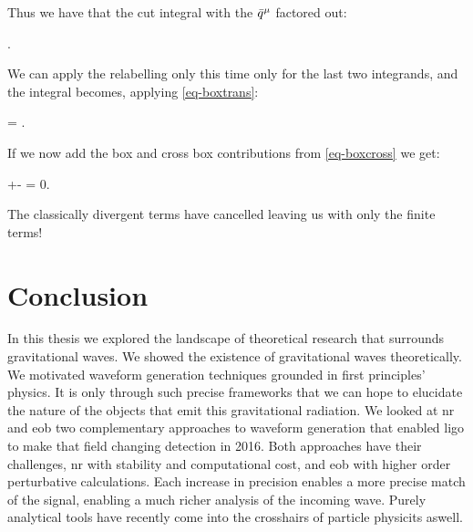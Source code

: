 \documentclass[
  10pt,
  a4paper,
  DIV=11,
  numbers=noendperiod,
  twoside]{scrreprt}
\let\[\relax \let\]\relax %
\DeclareRobustCommand{\[}{\begin{equation}}
\DeclareRobustCommand{\]}{\end{equation}}
\begin{document}
Thus we have that the cut integral with the \(\bar{q}_{}{}^{\mu}\) factored out:

\[
\int \dn[4]{\bar{\ell}}\Half{} .
\]

We can apply the relabelling only this time only for the last two
integrands, and the integral becomes, applying \ref{eq-boxtrans}:

\[
\int \dn[4]{\bar{\ell}}\Half{}= \int \dn[4]{\bar{\ell}}  .
\]

If we now add the box and cross box contributions from \ref{eq-boxcross}
we get:

\[
\int \dn[4]{\bar{\ell}}+-  =  0.
\]

The classically divergent terms have cancelled leaving us with only the
finite terms!


\hypertarget{conclusion}{%
\chapter{Conclusion}\label{conclusion}}

In this thesis we explored the landscape of theoretical research that
surrounds gravitational waves. We showed the existence of gravitational
waves theoretically. We motivated waveform generation techniques
grounded in first principles' physics. It is only through such precise
frameworks that we can hope to elucidate the nature of the objects that
emit this gravitational radiation. We looked at \gls{nr} and \gls{eob}
two complementary approaches to waveform generation that enabled
\gls{ligo} to make that field changing detection in 2016. Both
approaches have their challenges, \gls{nr} with stability and
computational cost, and \gls{eob} with higher order perturbative
calculations. Each increase in precision enables a more precise match of
the signal, enabling a much richer analysis of the incoming wave. Purely
analytical tools have recently come into the crosshairs of particle
physicits aswell.
\end{document}
